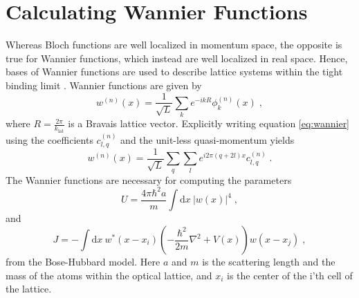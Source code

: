 \section{Calculating Wannier Functions}
Whereas Bloch functions are well localized in momentum space, the opposite is true for Wannier functions, which instead are well localized in real space. Hence, bases of Wannier functions are used to describe lattice systems within the tight binding limit \cite{manybodyBloch}. Wannier functions are given by
\begin{equation}
	w^{(n)}(x) = \frac{1}{\sqrt{L}} \sum_{k} e^{ -i k R } \phi_{k}^{(n)} (x) \; , \label{eq:wannier}
\end{equation}
where $R = \frac{2 \pi}{k_{\mathrm{lat}}}$ is a Bravais lattice vector. Explicitly writing equation \ref{eq:wannier} using the coefficients $c_{l,q}^{(n)}$ and the unit-less quasi-momentum yields
\begin{equation}
	w^{(n)}(x) = \frac{1}{\sqrt{L}} \sum_{q} \sum_{l} e^{ i 2 \pi \left( q + 2 l  \right) x} c_{l,q}^{(n)} \; . \label{eq:wannierrescaled}
\end{equation}
The Wannier functions are necessary for computing the parameters
\begin{equation}
	U = \frac{4 \pi \hbar^2 a}{m} \int \mathrm{d}x \ |w(x)|^4 \; , \label{eq:BH_U}
\end{equation}
and 
\begin{equation}
J = - \int \mathrm{d}x \ w^*(x-x_i) \left( - \frac{\hbar^2}{2 m} \nabla ^2 + V(x) \right) w(x-x_j) \; , \label{eq:BH_J}
\end{equation}
from the Bose-Hubbard model. Here $a$ and $m$ is the scattering length and the mass of the atoms within the optical lattice, and $x_i$ is the center of the i'th cell of the lattice. 